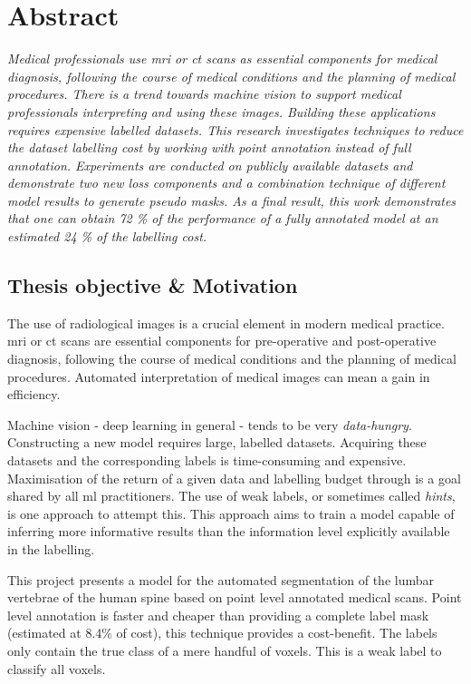 \chapter*{Abstract}

\begin{multicols}{2}
\thispagestyle{plain}
\par{
    \textit{
        Medical professionals use \acrfull{mri} or \acrfull{ct} scans as essential components for medical diagnosis, following the course of medical conditions and the planning of medical procedures.
        There is a trend towards machine vision to support medical professionals interpreting and using these images.
        Building these applications requires expensive labelled datasets.
        This research investigates techniques to reduce the dataset labelling cost by working with point annotation instead of full annotation.
        Experiments are conducted on publicly available datasets and demonstrate two new loss components and a combination technique of different model results to generate pseudo masks.
        As a final result, this work demonstrates that one can obtain 72 \% of the performance of a fully annotated model at an estimated 24 \% of the labelling cost. 
    }
}
\section*{Thesis objective \& Motivation}
\par{
    The use of radiological images is a crucial element in modern medical practice. 
    \acrshort{mri} or \acrshort{ct} scans are essential components for pre-operative and post-operative diagnosis, following the course of medical conditions and the planning of medical procedures.
    Automated interpretation of medical images can mean a gain in efficiency.
}
\par{
    Machine vision - deep learning in general - tends to be very \textit{data-hungry}. Constructing a new model requires large, labelled datasets.
    Acquiring these datasets and the corresponding labels is time-consuming and expensive. 
    Maximisation of the return of a given data and labelling budget through is a goal shared by all \acrshort{ml} practitioners.
    The use of weak labels, or sometimes called \textit{hints}, is one approach to attempt this.
    This approach aims to train a model capable of inferring more informative results than the information level explicitly available in the labelling.
}
\par{
    This project presents a model for the automated segmentation of the lumbar vertebrae of the human spine based on point level annotated medical scans.
    Point level annotation is faster and cheaper than providing a complete label mask (estimated at 8.4\% of cost\cite{Bearman2015}), this technique provides a cost-benefit. 
    The labels only contain the true class of a mere handful of voxels. This is a weak label to classify all voxels.
}




\end{multicols}
